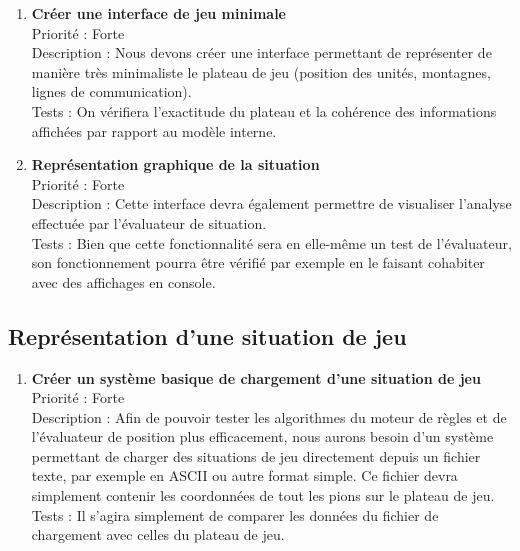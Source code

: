 			\begin{enumerate}

				\item \textbf{Créer une interface de jeu minimale} 
				\\[0.7\baselineskip]
				Priorité : Forte 
				\\[0.7\baselineskip]
				Description : Nous devons créer une interface permettant de représenter de manière très minimaliste le plateau de jeu (position des unités, 
				montagnes, lignes de communication). 
				\\[0.7\baselineskip]
				Tests : On vérifiera l'exactitude du plateau et la cohérence des informations affichées par rapport au modèle interne. 
				\\[0.7\baselineskip]

				\item \textbf{Représentation graphique de la situation} 
				\\[0.7\baselineskip]
				Priorité : Forte 
				\\[0.7\baselineskip]
				Description : Cette interface devra également permettre de visualiser l'analyse effectuée par l'évaluateur de situation. 
				\\[0.7\baselineskip]
				Tests : Bien que cette fonctionnalité sera en elle-même un test de l'évaluateur, son fonctionnement pourra être vérifié par exemple en 
				le faisant cohabiter avec des affichages en console. 
				\\[0.7\baselineskip]

				
			\end{enumerate}

		\subsection{Représentation d'une situation de jeu}

			\begin{enumerate}

				\item \textbf{Créer un système basique de chargement d'une situation de jeu} 
				\\[0.7\baselineskip]
				Priorité : Forte 
				\\[0.7\baselineskip]
				Description : Afin de pouvoir tester les algorithmes du moteur de règles et de l'évaluateur de position plus efficacement, nous aurons besoin 
				d'un système permettant de charger des situations de jeu directement depuis un fichier texte, par exemple en ASCII ou autre format simple. 
				Ce fichier devra simplement contenir les coordonnées de tout les pions sur le plateau de jeu. 
				\\[0.7\baselineskip]
				Tests : Il s'agira simplement de comparer les données du fichier de chargement avec celles du plateau de jeu. 
				\\[0.7\baselineskip]
				
			\end{enumerate}

